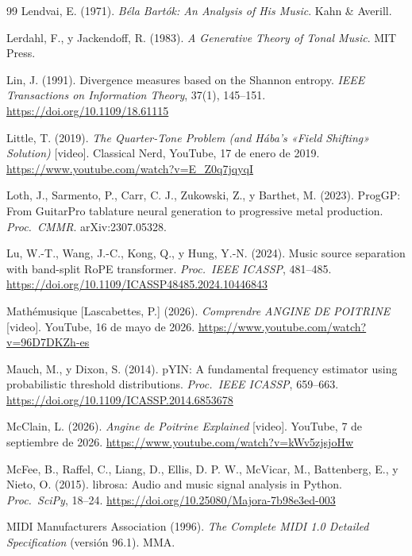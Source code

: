 \begin{thebibliography}{99}
Lendvai, E. (1971). \emph{Béla Bartók: An Analysis of His Music}. Kahn \& Averill.


Lerdahl, F., y Jackendoff, R. (1983). \emph{A Generative Theory of Tonal Music}. MIT Press.

Lin, J. (1991). Divergence measures based on the Shannon entropy. \emph{IEEE Transactions on Information Theory},
37(1), 145--151. \url{https://doi.org/10.1109/18.61115}

Little, T. (2019). \emph{The Quarter-Tone Problem (and Hába's «Field Shifting» Solution)} [video]. Classical Nerd,
YouTube, 17 de enero de 2019. \url{https://www.youtube.com/watch?v=E_Z0q7jqyqI}

Loth, J., Sarmento, P., Carr, C. J., Zukowski, Z., y Barthet, M. (2023). ProgGP: From GuitarPro tablature neural
generation to progressive metal production. \emph{Proc.\ CMMR}. arXiv:2307.05328.

Lu, W.-T., Wang, J.-C., Kong, Q., y Hung, Y.-N. (2024). Music source separation with band-split RoPE transformer.
\emph{Proc.\ IEEE ICASSP}, 481--485. \url{https://doi.org/10.1109/ICASSP48485.2024.10446843}

Mathémusique [Lascabettes, P.] (2026). \emph{Comprendre ANGINE DE POITRINE} [video]. YouTube, 16 de mayo de 2026.
\url{https://www.youtube.com/watch?v=96D7DKZh-es}

Mauch, M., y Dixon, S. (2014). pYIN: A fundamental frequency estimator using probabilistic threshold distributions.
\emph{Proc.\ IEEE ICASSP}, 659--663. \url{https://doi.org/10.1109/ICASSP.2014.6853678}

McClain, L. (2026). \emph{Angine de Poitrine Explained} [video]. YouTube, 7 de septiembre de 2026.
\url{https://www.youtube.com/watch?v=kWv5zjsjoHw}

McFee, B., Raffel, C., Liang, D., Ellis, D. P. W., McVicar, M., Battenberg, E., y Nieto, O. (2015). librosa: Audio and
music signal analysis in Python. \emph{Proc.\ SciPy}, 18--24. \url{https://doi.org/10.25080/Majora-7b98e3ed-003}

MIDI Manufacturers Association (1996). \emph{The Complete MIDI 1.0 Detailed Specification} (versión 96.1). MMA.


\end{thebibliography}
